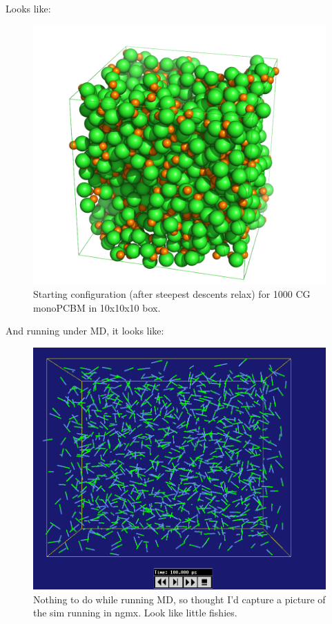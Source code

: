 \documentclass[hyperref]{labbook}
\begin{document}
Looks like:
\begin{figure}[h!]
\centering
\includegraphics[width=0.8\columnwidth]{./figs/monoPCBM-CG_1000_in_10x10x10_box_starting}
\caption{\label{monoPCBM-CG_1000_in_10x10x10_box_starting}
Starting configuration (after steepest descents relax) for 1000 CG monoPCBM in 10x10x10 box.
}
\end{figure}

And running under MD, it looks like:

\begin{figure}[h!]
\centering
\includegraphics[width=0.8\columnwidth]{./figs/monoPCBM-CG_1000_ngmx_render}
\caption{\label{monoPCBM-CG_1000_ngmx_render}
Nothing to do while running MD, so thought I'd capture a picture of the sim running in ngmx. Look like little fishies.
}
\end{figure}
\end{document}
